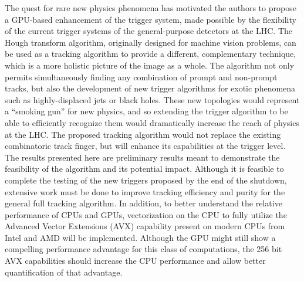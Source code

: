 \documentclass{JINST}
\begin{document}
The quest for rare new physics phenomena has motivated the authors to propose a GPU-based enhancement of the trigger
system, made possible by the flexibility of the current trigger systems of the general-purpose detectors at the LHC. The
Hough transform algorithm, originally designed for machine vision problems, can be used as a tracking algorithm to
provide a different, complementary technique, which is a more holistic picture of the image as a whole. The algorithm
not only permits simultaneously finding any combination of prompt and non-prompt tracks, but also the development of new trigger
algorithms for exotic phenomena such as highly-displaced jets or black holes. These new topologies would represent a
``smoking gun'' for new physics, and so extending the trigger algorithm to be able to efficiently recognize them would
dramatically increase the reach of physics at the LHC. The proposed tracking algorithm would not replace the existing
combinatoric track finger, but will enhance its capabilities at the trigger level. The results presented here are
preliminary results meant to demonstrate the feasibility of the algorithm and its potential impact. Although it is
feasible to complete the testing of the new triggers proposed by the end of the shutdown, extensive work must be done to
improve tracking efficiency and purity for the general full tracking algorithm. In addition,
to better understand the relative performance of CPUs and GPUs, vectorization on the CPU to fully
utilize the Advanced Vector Extensions (AVX) capability present on modern CPUs from Intel and AMD will be implemented.  Although the GPU
might still show a compelling performance advantage for this class of computations, the 256 bit AVX capabilities should
increase the CPU performance and allow better quantification of that advantage.


\end{document}
